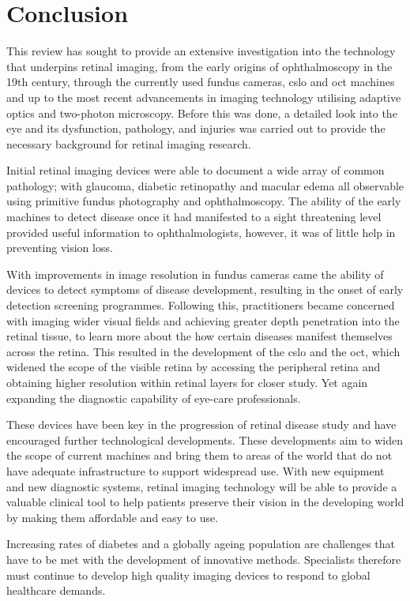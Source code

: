 \chapter{Conclusion}

\label{conclusion}

This review has sought to provide an extensive investigation
into the technology that underpins retinal imaging, from the
early origins of ophthalmoscopy in the 19th century, through the 
currently used fundus cameras, \gls{cslo} and \Gls{oct} machines and up 
to the most recent advancements in imaging technology utilising 
adaptive optics and two-photon microscopy. Before this was done, 
a detailed look into the eye and its dysfunction, pathology, and 
injuries was carried out to provide the necessary background for 
retinal imaging research.

Initial retinal imaging devices were able to document a wide array 
of common pathology; with glaucoma, diabetic retinopathy and
macular edema all observable using primitive fundus photography and 
ophthalmoscopy. The ability of the early machines to detect 
disease once it had manifested to a sight threatening level provided 
useful information to ophthalmologists, however, it was of little help 
in preventing vision loss. 

With improvements in image resolution in fundus cameras came 
the ability of devices to detect symptoms of disease development, 
resulting in the onset of early detection screening programmes. 
Following this, practitioners became concerned with imaging 
wider visual fields and achieving greater depth penetration into 
the retinal tissue, to learn more about the how certain diseases 
manifest themselves across the retina. This resulted in the 
development of the \gls{cslo} and the \Gls{oct}, which widened the scope 
of the visible retina by accessing the peripheral retina and obtaining 
higher resolution within retinal layers for closer study. Yet again 
expanding the diagnostic capability of eye-care professionals. 

These devices have been key in the progression of retinal disease 
study and have encouraged further technological developments. 
These developments aim to widen the scope of current machines 
and bring them to areas of the world that do not have adequate 
infrastructure to support widespread use. With new equipment and 
new diagnostic systems, retinal imaging technology will be able to 
provide a valuable clinical tool to help patients preserve their vision 
in the developing world by making them affordable and easy to use.
 
Increasing rates of diabetes and a globally ageing population are 
challenges that have to be met with the development of innovative 
methods. Specialists therefore must continue to develop high 
quality imaging devices to respond to global healthcare demands. 


